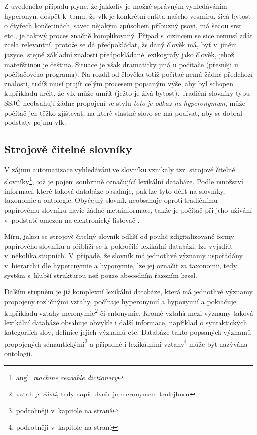 \documentclass[a4paper,11pt,openany,twoside]{book}
\newcommand{\itNameRef}[1]{\textit{\nameref{#1}}}
\newcommand\ex{\textsf}
\begin{document}
				Z uvedeného případu plyne, že jakkoliv je možné správným vyhledáváním hyperonym dospět k~tomu, že \ex{vlk} je konkrétní entita našeho vesmíru, živá bytost o čtyřech končetinách, savec nějakým způsobem příbuzný psovi, má šedou srst etc., je takový proces značně komplikovaný. Případ s~cizincem se sice nemusí zdát zcela relevantní, protože se dá předpokládat, že daný člověk má, byť v~jiném jazyce, stejné základní znalosti předpokládané lexikografy jako člověk, jehož mateřštinou je čeština. Situace je však dramaticky jiná u počítače (přesněji u počítačového programu). Na rozdíl od člověka totiž počítač nemá žádné předchozí znalosti, tudíž musí projít celým procesem popsaným výše, aby byl schopen kupříkladu určit, že \ex{vlk} může umřít (ježto je živá bytost). Tradiční slovníky typu SSJČ neobsahují žádné propojení ve stylu \textit{toto je odkaz na hyperonymum}, může počítač jen těžko zjišťovat, na které vlastně slovo se má podívat, aby se dobral podstaty pojmu \ex{vlk}.

				\subsection{Strojově čitelné slovníky}

					V zájmu automatizace vyhledávání ve slovníku vznikaly tzv. strojově čitelné slovníky\footnote{angl. \textit{machine readable dictionary}}, což je pojem souhrnně označující lexikální databáze. Podle množství informací, které taková databáze obsahuje, pak lze tyto dělit na slovníky, taxonomie a ontologie. Obyčejný slovník neobsahuje oproti tradičnímu papírovému slovníku navíc žádné metainformace, takže je počítač při jeho užívání v~podstatě omezen na elektronický listovač \parencite{miller1990introduction}. 

					Míru, jakou se strojově čitelný slovník odliší od pouhé zdigitalizované formy papírového slovníku a přiblíží se k~pokročilé lexikální databázi, lze vyjádřit v~několika stupních. V~případě, že slovník má jednotlivé významy uspořádány v~hierarchii dle hyperonymie a hyponymie, lze jej označit za taxonomii, tedy systém s~hlubší strukturou než pouze abecedním řazením hesel. 

					Dalším stupněm je již komplexní lexikální databáze, která má jednotlivé významy propojeny rozličnými vztahy, počínaje hyperonymií a hyponymií a pokračuje kupříkladu vztahy meronymie\footnote{vztah \textit{je částí}, tedy např. \ex{dveře} je meronymem \ex{trolejbusu}} či antonymie. Kromě vztahů mezi významy taková lexikální databáze obsahuje obvykle i další informace, například o syntaktických kategoriích slov, definice jejich významů etc. Databáze takto popsaných významů propojených sémantickými\footnote{podrobněji v~kapitole \itNameRef{cha:sem-vztahy} na straně \pageref{cha:sem-vztahy}} a případně i lexikálními vztahy\footnote{podrobněji v~kapitole \itNameRef{cha:lexvztah} na straně \pageref{cha:lexvztah}} může být nazývána ontologií. \parencite{garshol2004metadata}
\end{document}
